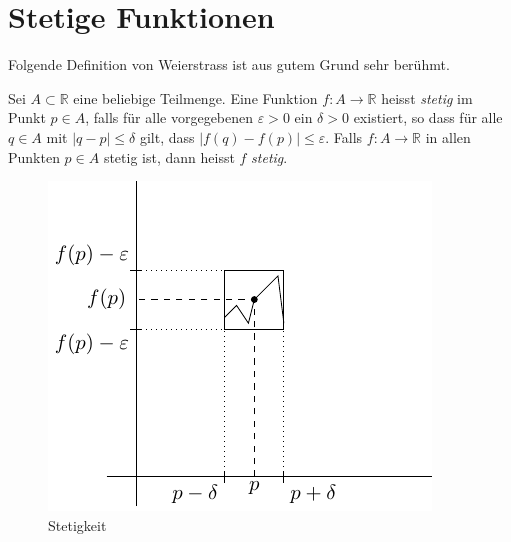 \documentclass[../main.tex]{subfiles}
\begin{document}
\chapter{Stetige Funktionen}

Folgende Definition von Weierstrass
ist aus gutem Grund sehr berühmt.

\begin{definition}
  Sei $A \subset \mathbb{R}$ 
  eine beliebige Teilmenge.
  Eine Funktion
  $f \colon A \to \mathbb{R}$ 
  heisst \emph{stetig} im Punkt
  $p \in A$, falls für
  alle vorgegebenen $\varepsilon > 0$
  ein  $\delta > 0$ existiert,
  so dass für alle $q \in A$ 
  mit $|q-p| \leq \delta$ gilt,
  dass $|f(q) - f(p)| \leq \varepsilon$.
  Falls $f \colon A \to \mathbb{R}$ in
  allen Punkten $p \in A$ stetig ist,
  dann heisst $f$ \emph{stetig}.
\end{definition}

\begin{figure}[htb]
  \centering
  \includegraphics{chapter3/images/conti}
  \caption{Stetigkeit}%
  \label{fig:conti}
\end{figure}
\end{document}
